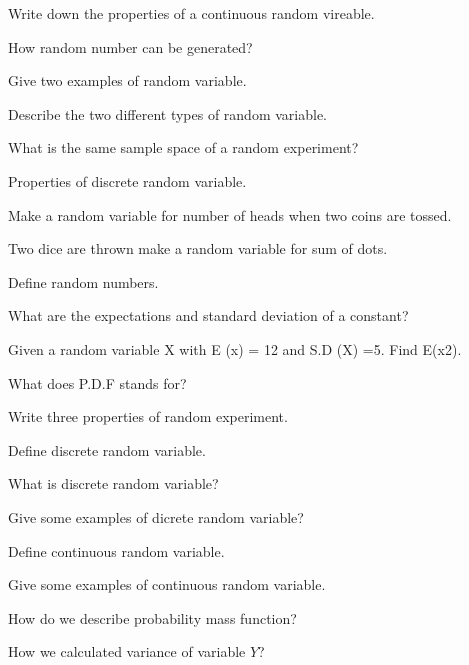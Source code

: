 \documentclass[11pt,a4paper]{article}
\begin{document}
\begin{shortlist}
\item Write down the properties of a continuous random vireable.

\item How random number can be generated?

\item Give two examples of random variable.

\item Describe the two different types of random variable.

\item What is the same sample space of a random experiment?

\item Properties of discrete random variable.

\item Make a random variable for number of heads when two coins are tossed.

\item Two dice are thrown make a random variable for sum of dots.

\item Define random numbers.

\item What are the expectations and standard deviation of a constant?

\item Given a random variable X with E (x) = 12 and S.D (X) =5. Find E(x2).

\item What does P.D.F stands for?

\item Write three properties of random experiment.

\item Define discrete random variable.

\item What is discrete random variable?

\item Give some examples of dicrete random variable?

\item Define continuous random variable.

\item Give some examples of continuous random variable.

\item How do we describe probability mass function?

\item How we calculated variance of variable $Y$?


\end{shortlist}
\end{document}
